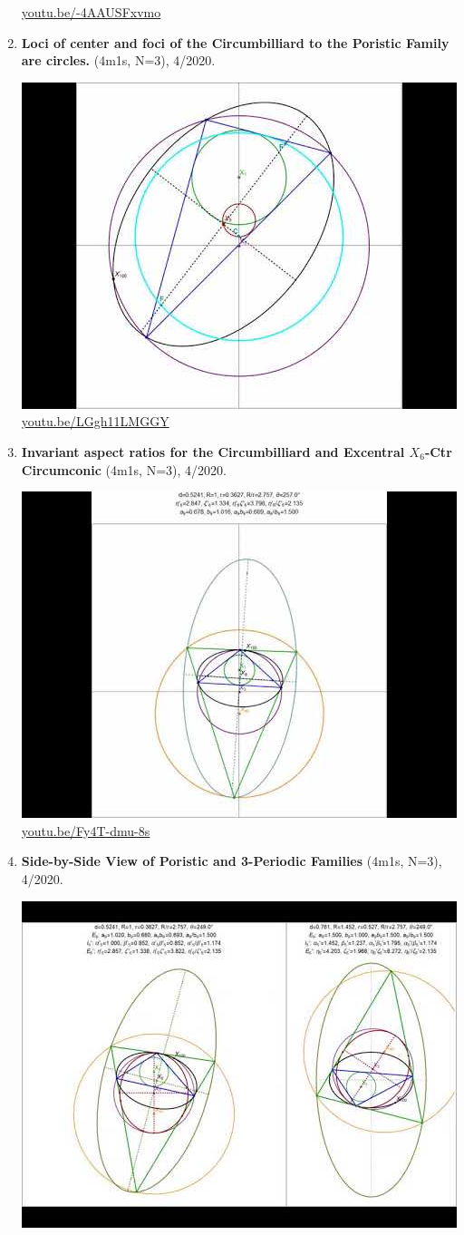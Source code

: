 \documentclass[12pt]{amsart}
\begin{document}
\begin{enumerate}[resume]
\begin{center}
\href{https://youtu.be/-4AAUSFxvmo}{\url{youtu.be/-4AAUSFxvmo}}\end{center}
% 
\item \textbf{Loci of center and foci of the Circumbilliard to the Poristic Family are circles.} (4m1s, N=3), 4/2020. 
\begin{center}\includegraphics[width=.5\textwidth]{pics/LGgh11LMGGY.jpg} \\ 
\href{https://youtu.be/LGgh11LMGGY}{\url{youtu.be/LGgh11LMGGY}}\end{center}
% 
\item \textbf{Invariant aspect ratios for the Circumbilliard and Excentral $X_{6}$-Ctr Circumconic} (4m1s, N=3), 4/2020. 
\begin{center}\includegraphics[width=.5\textwidth]{pics/Fy4T-dmu-8s.jpg} \\ 
\href{https://youtu.be/Fy4T-dmu-8s}{\url{youtu.be/Fy4T-dmu-8s}}\end{center}
% 
\item \textbf{Side-by-Side View of Poristic and 3-Periodic Families} (4m1s, N=3), 4/2020. 
\begin{center}\includegraphics[width=.5\textwidth]{pics/NvjrX6XKSFw.jpg} \\ 

\end{center}
\end{enumerate}
\end{document}
